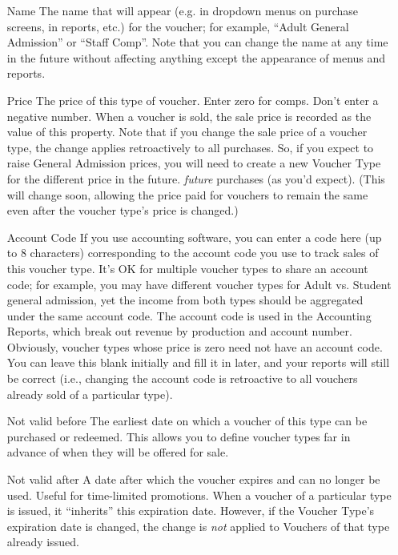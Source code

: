 \begin{itemize}
\item[Name] The name that will appear (e.g. in dropdown menus on
  purchase screens, in reports, etc.) for the voucher; for example,
  ``Adult General Admission'' or ``Staff Comp''.  Note that
  you can change the name at any time in the future without affecting
  anything except the appearance of menus and reports.
\item[Price] The price of this type of voucher.  Enter zero for comps.
  Don't enter a negative number.  When a voucher is sold, the sale price
  is recorded as the value of this property.  Note that if you change
  the sale price of a voucher type, the change applies retroactively to
  all purchases.    So, if you expect
  to raise General Admission prices, you will need to create a new
  Voucher Type for the different price in the future.
  \emph{future} purchases (as you'd expect).  (This will change soon,
  allowing the price paid for vouchers to remain the same even after the
  voucher type's price is changed.)
\item[Account Code] If you use accounting software, you can enter a code
  here (up to 8 characters) corresponding to the account code you use to
  track sales of this voucher type.  It's OK for multiple voucher types
  to share an account code; for example, you may have different voucher
  types for Adult vs. Student general admission, yet the income from
  both types should be aggregated under the same account code.  The
  account code is used in the Accounting Reports, which break out
  revenue by production and account number.  Obviously, voucher types
  whose price is zero need not have an account code.  You can leave this
  blank initially and fill it in later, and your reports will still be
  correct (i.e., changing the account code is retroactive to all
  vouchers already sold of a particular type).
\item[Not valid before] The earliest date on which a voucher of this
  type can be purchased or redeemed. This allows you to define voucher
  types far in advance of when they will be offered for sale.
\item[Not valid after] A date after which the voucher expires and can no
  longer be used.  Useful for time-limited promotions.  When a voucher
  of a particular type is issued, it ``inherits'' this expiration date.
  However, if the Voucher Type's expiration date is changed, the change
  is \emph{not} applied to Vouchers of that type already issued.


\end{itemize}
